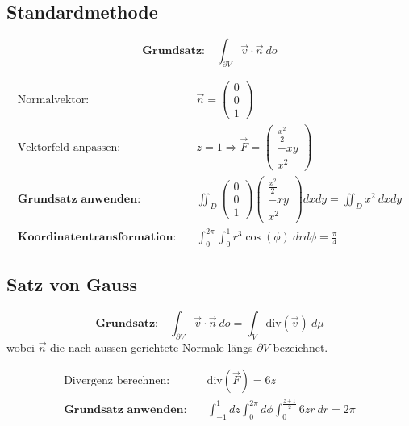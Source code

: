 \documentclass[11pt]{article}
\begin{document}
\subsection{Standardmethode}

\begin{equation*}
	\textbf{Grundsatz:}\quad\int_{\partial V} \vec{v}\cdot\vec{n}\ do
\end{equation*}

\begin{equation*}
\begin{split}
	\text{Normalvektor:}\quad & \vec{n} = \begin{pmatrix}
		0 \\ 0 \\ 1
	\end{pmatrix} \\
	\text{Vektorfeld anpassen:}\quad & z = 1 \Rightarrow \vec{F} = \begin{pmatrix}
		\frac{x^2}{2} \\ -xy \\ x^2
	\end{pmatrix} \\
	\textbf{Grundsatz anwenden:}\quad & \iint_D \begin{pmatrix}
		0 \\ 0 \\ 1
	\end{pmatrix}\begin{pmatrix}
		\frac{x^2}{2} \\ -xy \\ x^2
	\end{pmatrix} dxdy = \iint_D x^2\ dxdy \\
	\textbf{Koordinatentransformation:}\quad & \int_0^{2\pi} \int_0^1 r^3\cos(\phi)\ drd\phi = \frac{\pi}{4}
\end{split}
\end{equation*}

\subsection{Satz von Gauss}

\begin{equation*}
	\textbf{Grundsatz:}\quad\int_{\partial V} \vec{v}\cdot\vec{n}\ do = \int_V \text{div}(\vec{v})\ d\mu
\end{equation*}
wobei $\vec{n}$ die nach aussen gerichtete Normale längs $\partial V$ bezeichnet.

\begin{equation*}
\begin{split}
	\text{Divergenz berechnen:}\quad & \text{div}(\vec{F}) = 6z \\
	\textbf{Grundsatz anwenden:}\quad & \int_{-1}^1 dz \int_0^{2\pi} d\phi \int_0^{\frac{z+1}{2}} 6zr\ dr = 2\pi
\end{split}
\end{equation*}
\end{document}
